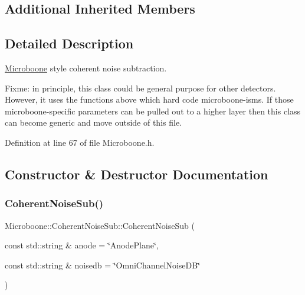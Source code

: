 \subsection*{Additional Inherited Members}


\subsection{Detailed Description}
\hyperlink{namespace_wire_cell_1_1_sig_proc_1_1_microboone}{Microboone} style coherent noise subtraction.

Fixme\+: in principle, this class could be general purpose for other detectors. However, it uses the functions above which hard code microboone-\/isms. If those microboone-\/specific parameters can be pulled out to a higher layer then this class can become generic and move outside of this file. 

Definition at line 67 of file Microboone.\+h.



\subsection{Constructor \& Destructor Documentation}
\mbox{\label{class_wire_cell_1_1_sig_proc_1_1_microboone_1_1_coherent_noise_sub_a3f5ef54c3ed9fb3f8dbd9141aa08bb73}} 
\subsubsection{\texorpdfstring{Coherent\+Noise\+Sub()}{CoherentNoiseSub()}}
{\footnotesize\ttfamily Microboone\+::\+Coherent\+Noise\+Sub\+::\+Coherent\+Noise\+Sub (\begin{DoxyParamCaption}\item[{const std\+::string \&}]{anode = {\ttfamily \char`\"{}AnodePlane\char`\"{}},  }\item[{const std\+::string \&}]{noisedb = {\ttfamily \char`\"{}OmniChannelNoiseDB\char`\"{}} }\end{DoxyParamCaption})}




